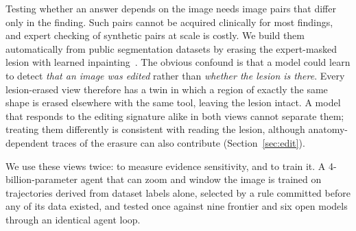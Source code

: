 \documentclass[11pt]{article}
\begin{document}
Testing whether an answer depends on the image needs image pairs that differ only in the finding. Such pairs cannot be acquired clinically for most findings, and expert checking of synthetic pairs at scale is costly. We build them automatically from public segmentation datasets by erasing the expert-masked lesion with learned inpainting~\cite{lama}. The obvious confound is that a model could learn to detect \emph{that an image was edited} rather than \emph{whether the lesion is there}. Every lesion-erased view therefore has a twin in which a region of exactly the same shape is erased elsewhere with the same tool, leaving the lesion intact. A model that responds to the editing signature alike in both views cannot separate them; treating them differently is consistent with reading the lesion, although anatomy-dependent traces of the erasure can also contribute (Section~\ref{sec:edit}).

We use these views twice: to measure evidence sensitivity, and to train it. A 4-billion-parameter agent that can zoom and window the image is trained on trajectories derived from dataset labels alone, selected by a rule committed before any of its data existed, and tested once against nine frontier and six open models through an identical agent loop.
\end{document}
